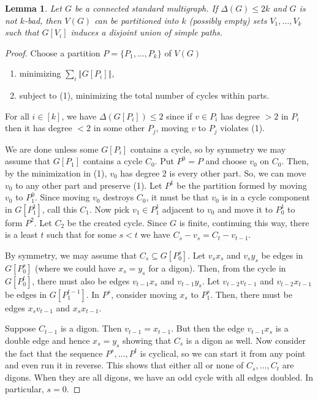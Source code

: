 \documentclass[12pt]{amsart}
\theoremstyle{plain}
\newtheorem{lem}[thm]{Lemma}
\theoremstyle{definition}
\theoremstyle{remark}
\newcommand{\size}[1]{\left\Vert#1\right\Vert}
\newcommand{\irange}[1]{\left[#1\right]}
\begin{document}
\begin{lem}
Let $G$ be a connected standard multigraph. If $\Delta(G) \le 2k$ and $G$ is not $k$-bad, then $V(G)$ can be partitioned into $k$ (possibly empty) sets $V_1, \ldots, V_k$ such that $G[V_i]$ induces a disjoint union of simple paths.
\end{lem}
\begin{proof}
Choose a partition $P = \{P_1, \ldots, P_k\}$ of $V(G)$ 
\begin{enumerate}
\item minimizing $\sum_i \size{G[P_i]}$,
\item subject to (1), minimizing the total number of cycles within parts.
\end{enumerate}

For all $i \in \irange{k}$, we have $\Delta(G[P_i]) \le 2$ since if $v \in P_i$ has degree $>2$ in $P_i$ then it has degree $<2$ in some other $P_j$, moving $v$ to $P_j$ violates (1).

We are done unless some $G[P_i]$ contains a cycle, so by symmetry we may assume that $G[P_1]$ contains a cycle $C_0$.  Put $P^0 = P$ and choose $v_0$ on $C_0$. Then, by the minimization in (1), $v_0$ has degree $2$ is every other part.  So, we can move $v_0$ to any other part and preserve (1). Let $P^1$ be the partition formed by moving $v_0$ to $P^0_1$.  Since moving $v_0$ destroys $C_0$, it must be that $v_0$ is in a cycle component in $G[P^1_1]$, call this $C_1$.  Now pick $v_1 \in P^1_1$ adjacent to $v_0$ and move it to $P^1_0$ to form $P^2$.  Let $C_2$ be the created cycle.  Since $G$ is finite, continuing this way, there is a least $t$ such that for some $s < t$ we have $C_s - v_s = C_t - v_{t-1}$.

By symmetry, we may assume that $C_s \subseteq G[P^s_0]$.  Let $v_sx_s$ and $v_sy_s$ be edges in $G[P^s_0]$ (where we could have $x_s = y_s$ for a digon). Then, from the cycle in $G[P^t_0]$, there must also be edges $v_{t-1}x_s$ and $v_{t-1}y_s$.  Let $v_{t-2}v_{t-1}$ and $v_{t-2}x_{t-1}$ be edges in $G[P^{t-1}_1]$. In $P^s$, consider moving $x_s$ to $P^s_1$.  Then, there must be edges $x_sv_{t-1}$ and $x_sx_{t-1}$.

Suppose $C_{t-1}$ is a digon.  Then $v_{t-1} = x_{t-1}$.  But then the edge $v_{t-1}x_s$ is a double edge and hence $x_s = y_s$ showing that $C_s$ is a digon as well.  Now consider the fact that the sequence $P^s, \ldots, P^t$ is cyclical, so we can start it from any point and even run it in reverse.  This shows that either all or none of $C_s, \ldots, C_t$ are digons.  When they are all digons, we have an odd cycle with all edges doubled.  In particular, $s = 0$.


\end{proof}
\end{document}
